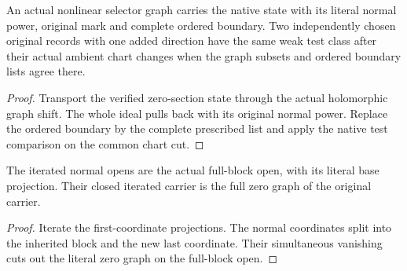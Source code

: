\begin{theorem}
\label{hir:g1-actual-nonlinear-native-selector-comparison}
\leanok
An actual nonlinear selector graph carries the native
state with its literal normal power, original mark and
complete ordered boundary. Two independently chosen
original records with one added direction have the
same weak test class after their actual ambient chart
changes when the graph subsets and ordered boundary
lists agree there.
\end{theorem}
\begin{proof}
Transport the verified zero-section state through the
actual holomorphic graph shift. The whole ideal pulls
back with its original normal power. Replace the ordered
boundary by the complete prescribed list and apply the
native test comparison on the common chart cut.
\end{proof}

\begin{theorem}
\label{hir:g1-finite-normal-block-geometry}
\leanok
The iterated normal opens are the actual full-block open,
with its literal base projection. Their closed iterated
carrier is the full zero graph of the original carrier.
\end{theorem}
\begin{proof}
Iterate the first-coordinate projections. The normal
coordinates split into the inherited block and the new
last coordinate. Their simultaneous vanishing cuts out
the literal zero graph on the full-block open.
\end{proof}


